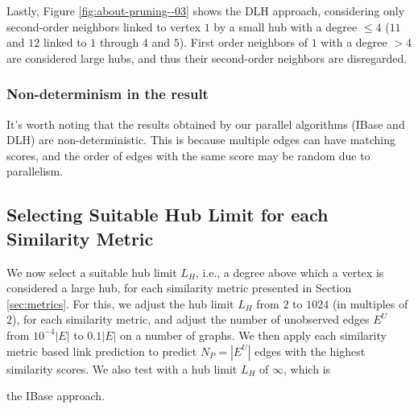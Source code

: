 Lastly, Figure \ref{fig:about-pruning--03} shows the DLH approach, considering only second-order neighbors linked to vertex $1$ by a small hub with a degree $\leq 4$ ($11$ and $12$ linked to $1$ through $4$ and $5$). First order neighbors of $1$ with a degree $> 4$ are considered large hubs, and thus their second-order neighbors are disregarded.


\subsubsection{Non-determinism in the result}

It's worth noting that the results obtained by our parallel algorithms (IBase and DLH) are non-deterministic. This is because multiple edges can have matching scores, and the order of edges with the same score may be random due to parallelism.




\subsection{Selecting Suitable Hub Limit for each Similarity Metric}
\label{sec:select-limit}

We now select a suitable hub limit $L_H$, i.e., a degree above which a vertex is considered a large hub, for each similarity metric presented in Section \ref{sec:metrics}. For this, we adjust the hub limit $L_H$ from $2$ to $1024$ (in multiples of $2$), for each similarity metric, and adjust the number of unobserved edges $E^U$ from $10^{-4}|E|$ to $0.1|E|$ on a number of graphs. We then apply each similarity metric based link prediction to predict $N_P = |E^U|$ edges with the highest similarity scores. We also test with a hub limit $L_H$ of $\infty$, which is the IBase approach.


